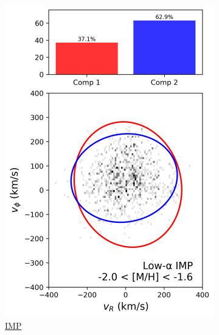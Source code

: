 \documentclass[a4paper,12pt]{article}
\begin{document}
\begin{figure}[H]
\begin{subfigure}{0.24\linewidth}
    \includegraphics[width=\linewidth]{../figures/gmm_imp_low_alpha_k2.png}
    \caption{\href{https://raw.githack.com/raunaq-rai/Disentangling-the-Milky-Way-using-GMM/main/figures/IMP_low____-2\%5BM_H\%5D-1.6.html}{IMP}}
    \label{fig:gmm_imp_lo}
  \end{subfigure}\hfill
  \begin{subfigure}{0.24\linewidth}
    \centering

\end{subfigure}
\end{figure}
\end{document}
